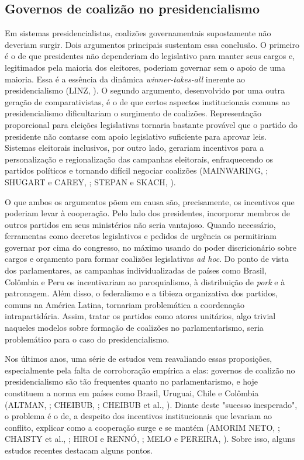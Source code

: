 \subsection{Governos de coalizão no presidencialismo}

Em sistemas presidencialistas, coalizões governamentais supostamente não deveriam surgir. Dois argumentos principais sustentam essa conclusão. O primeiro é o de que presidentes não dependeriam do legislativo para manter seus cargos e, legitimados pela maioria dos eleitores, poderiam governar sem o apoio de uma maioria. Essa é a essência da dinâmica \textit{winner-takes-all} inerente ao presidencialismo (LINZ, \citeyear{linz1990}). O segundo argumento, desenvolvido por uma outra geração de comparativistas, é o de que certos aspectos institucionais comuns ao presidencialismo dificultariam o surgimento de coalizões. Representação proporcional para eleições legislativas tornaria bastante provável que o partido do presidente não contasse com apoio legislativo suficiente para aprovar leis. Sistemas eleitorais inclusivos, por outro lado, gerariam incentivos para a personalização e regionalização das campanhas eleitorais, enfraquecendo os partidos políticos e tornando difícil negociar coalizões (MAINWARING, \citeyear{mainwaring1993}; SHUGART e CAREY, \citeyear{shugart1992}; STEPAN e SKACH, \citeyear{stepan1993}).

O que ambos os argumentos põem em causa são, precisamente, os incentivos que poderiam levar à cooperação. Pelo lado dos presidentes, incorporar membros de outros partidos em seus ministérios não seria vantajoso. Quando necessário, ferramentas como decretos legislativos e pedidos de urgência os permitiriam governar por cima do congresso, no máximo usando do poder discricionário sobre cargos e orçamento para formar coalizões legislativas \textit{ad hoc}. Do ponto de vista dos parlamentares, as campanhas individualizadas de países como Brasil, Colômbia e Peru os incentivariam ao paroquialismo, à distribuição de \textit{pork} e à patronagem. Além disso, o federalismo e a tibieza organizativa dos partidos, comuns na América Latina, tornariam problemática a coordenação intrapartidária. Assim, tratar os partidos como atores unitários, algo trivial naqueles modelos sobre formação de coalizões no parlamentarismo, seria problemático para o caso do presidencialismo.

Nos últimos anos, uma série de estudos vem reavaliando essas proposições, especialmente pela falta de corroboração empírica a elas: governos de coalizão no presidencialismo são tão frequentes quanto no parlamentarismo, e hoje constituem a norma em países como Brasil, Uruguai, Chile e Colômbia (ALTMAN, \citeyear{altman2000}; CHEIBUB, \citeyear{cheibub2007}; CHEIBUB et al., \citeyear{cheibub2004}). Diante deste "sucesso inesperado", o problema é o de, a despeito dos incentivos institucionais que levariam ao conflito, explicar como a cooperação surge e se mantém (AMORIM NETO, \citeyear{neto2006}; CHAISTY et al., \citeyear{chaisty2014}; HIROI e RENNÓ, \citeyear{hiroi2014}; MELO e PEREIRA, \citeyear{melo2013}). Sobre isso, alguns estudos recentes destacam alguns pontos.

